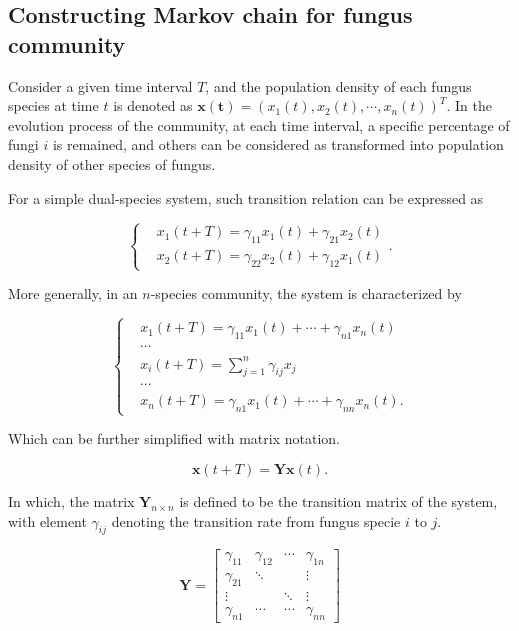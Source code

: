 \subsection{Constructing Markov chain for fungus community}

Consider a given time interval $T$, and the population density of each fungus species at time $t$ is denoted as $\boldsymbol{x(t)} = (x_1(t), x_2(t), \cdots, x_n(t))^T$. In the evolution process of the community, at each time interval, a specific percentage of fungi $i$ is remained, and others can be considered as transformed into population density of other species of fungus.

For a simple dual-species system, such transition relation can be expressed as

\begin{equation}
    \left\{\begin{aligned} &
        x_1(t+T) = \gamma_{11}x_1(t) + \gamma_{21}x_2(t) \\ &
        x_2(t+T) = \gamma_{22}x_2(t) + \gamma_{12}x_1(t)
    \end{aligned}\right..
\end{equation}

More generally, in an $n$-species community, the system is characterized by

\begin{equation}
    \left\{\begin{aligned} &
        x_1(t+T) = \gamma_{11}x_1(t) + \cdots + \gamma_{n1}x_n(t) \\ & \cdots \\ &
        x_i(t+T) = \sum_{j=1}^n \gamma_{ij}x_j \\ & \cdots \\ &
        x_n(t+T) = \gamma_{n1}x_1(t) + \cdots + \gamma_{nn}x_n(t).
    \end{aligned}\right.
\end{equation}

Which can be further simplified with matrix notation.

\begin{equation}\label{eq:trans}
    \boldsymbol{x}(t+T) = \boldsymbol{Y}\boldsymbol{x}(t).
\end{equation}

In which, the matrix $\boldsymbol{Y}_{n\times n}$ is defined to be the transition matrix of the system, with element $\gamma_{ij}$ denoting the transition rate from fungus specie $i$ to $j$.

\begin{equation}
    \boldsymbol{Y} =
    \begin{bmatrix}
        \gamma_{11} & \gamma_{12} & \cdots & \gamma_{1n} \\
        \gamma_{21} & \ddots & & \vdots \\
        \vdots & & \ddots & \vdots \\
        \gamma_{n1} & \cdots & \cdots & \gamma_{nn}
    \end{bmatrix}
\end{equation}

